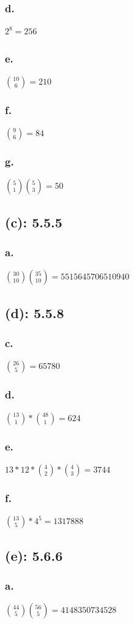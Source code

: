 \documentclass[titlepage]{article}\pagestyle{empty}
\begin{document}
\subsubsection*{d.} $2^8=256$
\subsubsection*{e.} $\binom{10}{6}=210$
\subsubsection*{f.} $\binom{9}{6}=84$
\subsubsection*{g.} $\binom{5}{1}\binom{5}{3}=50$
\subsection*{(c): 5.5.5}
\subsubsection*{a.} $\binom{30}{10}\binom{35}{10}=5515645706510940$
\subsection*{(d): 5.5.8}
\subsubsection*{c.} $\binom{26}{5}=65780$ 
\subsubsection*{d.} $\binom{13}{1}*\binom{48}{1}=624$
\subsubsection*{e.} $13 * 12 * \binom{4}{2} * \binom{4}{3} = 3744$
\subsubsection*{f.} $\binom{13}{5}*4^5=1317888$
\subsection*{(e): 5.6.6}
\subsubsection*{a.} $\binom{44}{5}\binom{56}{5}=4148350734528$
\end{document}
